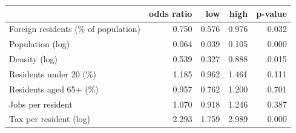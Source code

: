 \begin{tabular}{lrrrr}
\toprule
 & odds ratio & low & high & p-value \\
\midrule
Foreign residents (\% of population) & 0.750 & 0.576 & 0.976 & 0.032 \\
Population (log) & 0.064 & 0.039 & 0.105 & 0.000 \\
Density (log) & 0.539 & 0.327 & 0.888 & 0.015 \\
Residents under 20 (\%) & 1.185 & 0.962 & 1.461 & 0.111 \\
Residents aged 65+ (\%) & 0.957 & 0.762 & 1.200 & 0.701 \\
Jobs per resident & 1.070 & 0.918 & 1.246 & 0.387 \\
Tax per resident (log) & 2.293 & 1.759 & 2.989 & 0.000 \\
\bottomrule
\end{tabular}
